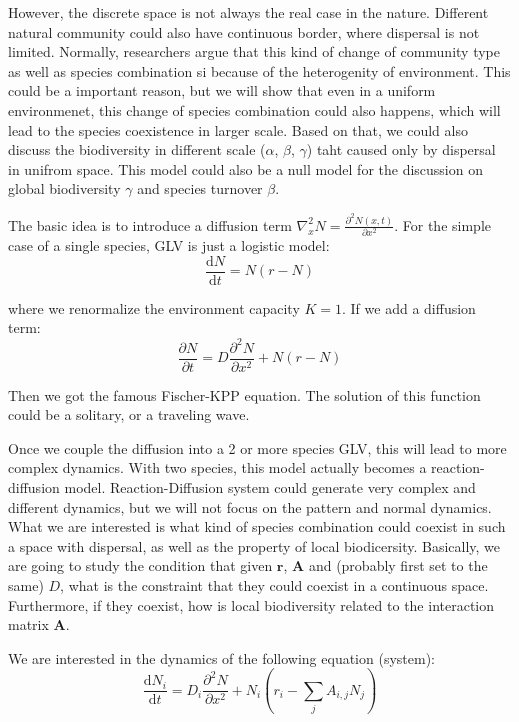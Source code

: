 \documentclass[12pt, a4paper]{article}
\begin{document}
However, the discrete space is not always the real case in the nature. Different natural community could also have continuous border, where dispersal is not limited. Normally, researchers argue that this kind of change of community type as well as species combination si because of the heterogenity of environment. This could be a important reason, but we will show that even in a uniform environmenet, this change of species combination could also happens, which will lead to the species coexistence in larger scale. Based on that, we could also discuss the biodiversity in different scale ($\alpha$, $\beta$, $\gamma$) taht caused only by dispersal in unifrom space. This model could also be a null model for the discussion on global biodiversity $\gamma$ and species turnover $\beta$.

The basic idea is to introduce a diffusion term $\nabla^2_{x}N = \frac{\partial^2 N(x,t)}{\partial x^2}$. For the simple case of a single species, GLV is just a logistic model:
\begin{equation*}
    \frac{\mathrm{d} N}{\mathrm{d}t} = N(r-N)
\end{equation*}

where we renormalize the environment capacity $K = 1$.
If we add a diffusion term:
\begin{equation}
    \frac{\partial N}{\partial t} = D\frac{\partial^2 N}{\partial x^2} +  N(r-N)
\end{equation}

Then we got the famous Fischer-KPP equation. The solution of this function could be a solitary, or a traveling wave.

Once we couple the diffusion into a 2 or more species GLV, this will lead to more complex dynamics. With two species, this model actually becomes a reaction-diffusion model. Reaction-Diffusion system could generate very complex and different dynamics, but we will not focus on the pattern and normal dynamics. What we are interested is what kind of species combination could coexist in such a space with dispersal, as well as the property of local biodicersity. Basically, we are going to study the condition that given $\bm{r}$, $\bm{A}$ and (probably first set to the same) $D$, what is the constraint that they could coexist in a continuous space. Furthermore, if they coexist, how is local biodiversity related to the interaction matrix $\bm{A}$.

We are interested in the dynamics of the following equation (system):
\begin{equation}
    \frac{\mathrm{d}N_i}{\mathrm{d}t}
    = D_{i}\frac{\partial^2 N}{\partial x^2} +
    N_i \left( r_i - \sum_{j} A_{i,j} N_j \right)
\end{equation}
\end{document}
